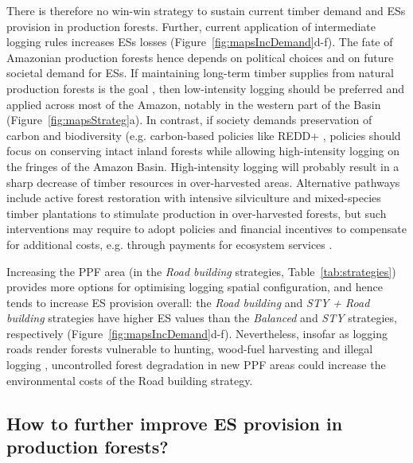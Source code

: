 \documentclass{article}
\begin{document}
There is therefore no win-win strategy to sustain current timber demand and ESs provision in production forests. Further, current application of intermediate logging rules increases ESs losses (Figure~\ref{fig:mapsIncDemand}d-f). The fate of Amazonian production forests hence depends on political choices and on future societal demand for ESs. If maintaining long-term timber supplies from natural production forests is the goal \cite{Zarin2007}, then low-intensity logging should be preferred and applied across most of the Amazon, notably in the western part of the Basin (Figure~\ref{fig:mapsStrateg}a). In contrast, if society demands preservation of carbon and biodiversity (e.g. carbon-based policies like REDD+ \cite{Stickler2009}, policies should focus on conserving intact inland forests while allowing high-intensity logging on the fringes of the Amazon Basin. High-intensity logging will probably result in a sharp decrease of timber resources in over-harvested areas. Alternative pathways include active forest restoration with intensive silviculture and mixed-species timber plantations \cite{Lamb2005} to stimulate production in over-harvested forests, but such interventions may require to adopt policies and financial incentives to compensate for additional costs, e.g. through payments for ecosystem services \cite{Salzman2018}.

Increasing the PPF area (in the \textit{Road building} strategies, Table~\ref{tab:strategies}) provides more options for optimising logging spatial configuration, and hence tends to increase ES provision overall: the \textit{Road building}  and \textit{STY  + Road building} strategies have higher ES values than the \textit{Balanced} and \textit{STY} strategies, respectively (Figure~\ref{fig:mapsIncDemand}d-f). Nevertheless, insofar as logging roads render forests vulnerable to hunting, wood-fuel harvesting and illegal logging \cite{Laurance2009a}, uncontrolled forest degradation in new PPF areas could increase the environmental costs of the Road building strategy.
 
\subsection{How to further improve ES provision in production forests?}
\end{document}
